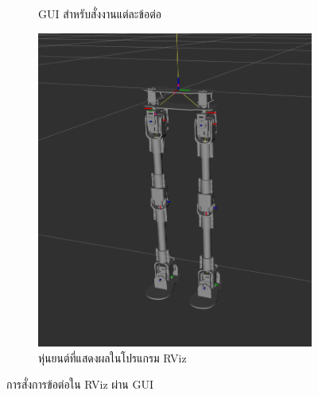 \begin{figure}[!ht]
\begin{subfigure}[b]{0.15\textwidth}
        \caption{GUI สำหรับสั่งงานแต่ละข้อต่อ}
    \end{subfigure}
    \hfill
    \begin{subfigure}[b]{0.50\textwidth}
        \centering
        \includegraphics[width=\textwidth]{chapter4/images/uthai_rviz_model.png}
        \caption{หุ่นยนต์ที่แสดงผลในโปรแกรม RViz}
    \end{subfigure}
    \caption{การสั่งการข้อต่อใน RViz ผ่าน GUI}
\end{figure}


\clearpage
